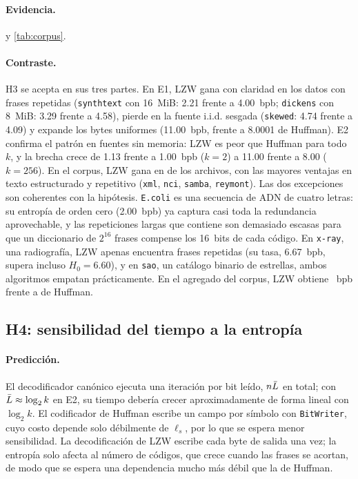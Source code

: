 \paragraph{Evidencia.}  y \cref{tab:corpus}.
\paragraph{Contraste.} H3 se acepta en sus tres partes. En E1, LZW gana con claridad en los
datos con frases repetidas (\texttt{synthtext} con 16~MiB: 2.21 frente a 4.00~bpb;
\texttt{dickens} con 8~MiB: 3.29 frente a 4.58), pierde en la fuente i.i.d. sesgada
(\texttt{skewed}: 4.74 frente a 4.09) y expande los bytes uniformes (11.00~bpb, frente a
8.0001 de Huffman). E2 confirma el patrón en fuentes sin memoria: LZW es peor que Huffman para
todo $k$, y la brecha crece de 1.13 frente a 1.00~bpb ($k = 2$) a 11.00 frente a 8.00
($k = 256$). En el corpus, LZW gana en \resLzwWins{} de los \resCorpusFiles{} archivos, con las
mayores ventajas en texto estructurado y repetitivo (\texttt{xml}, \texttt{nci},
\texttt{samba}, \texttt{reymont}). Las dos excepciones son coherentes con la hipótesis.
\texttt{E.coli} es una secuencia de ADN de cuatro letras: su entropía de orden cero (2.00~bpb)
ya captura casi toda la redundancia aprovechable, y las repeticiones largas que contiene son
demasiado escasas para que un diccionario de $2^{16}$ frases compense los 16~bits de cada
código. En \texttt{x-ray}, una radiografía, LZW apenas encuentra frases repetidas (su tasa, 6.67~bpb,
supera incluso $H_0 = 6.60$), y en
\texttt{sao}, un catálogo binario de estrellas, ambos algoritmos empatan prácticamente. En el
agregado del corpus, LZW obtiene \resCorpusLzwBpb{}~bpb frente a \resCorpusHuffBpb{} de Huffman.

\subsection{H4: sensibilidad del tiempo a la entropía}
\label{sec:disc-h4}
\paragraph{Predicción.} El decodificador canónico ejecuta una iteración por bit leído, $n\bar{L}$
en total; con $\bar{L} \approx \log_2 k$ en E2, su tiempo debería crecer aproximadamente de forma
lineal con $\log_2 k$. El codificador de Huffman escribe un campo por símbolo con
\texttt{BitWriter}, cuyo costo depende solo débilmente de $\ell_s$, por lo que se espera
menor sensibilidad. La decodificación de LZW escribe cada byte de salida una vez; la entropía
solo afecta al número de códigos, que crece cuando las frases se acortan, de modo que se espera
una dependencia mucho más débil que la de Huffman.


